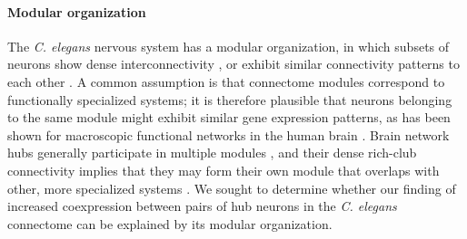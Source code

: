 \documentclass[10pt,letterpaper]{article}
\begin{document}
\paragraph{Modular organization}
The \emph{C. elegans} nervous system has a modular organization, in which subsets of neurons show dense interconnectivity \cite{Kim2014, Pan:2010jt, Bassett2010}, or exhibit similar connectivity patterns to each other \cite{Achacoso:1992ay, Pavlovic2014}.
A common assumption is that connectome modules correspond to functionally specialized systems; it is therefore plausible that neurons belonging to the same module might exhibit similar gene expression patterns, as has been shown for macroscopic functional networks in the human brain \cite{Richiardi2015}.
Brain network hubs generally participate in multiple modules \cite{vandenHeuvel:2013ij, deReus:2014cz}, and their dense rich-club connectivity implies that they may form their own module that overlaps with other, more specialized systems \cite{Fornito:2015dq, deReus:2013cy, ZamoraLopez:2010hy}.
We sought to determine whether our finding of increased coexpression between pairs of hub neurons in the \emph{C. elegans} connectome can be explained by its modular organization.
\end{document}
